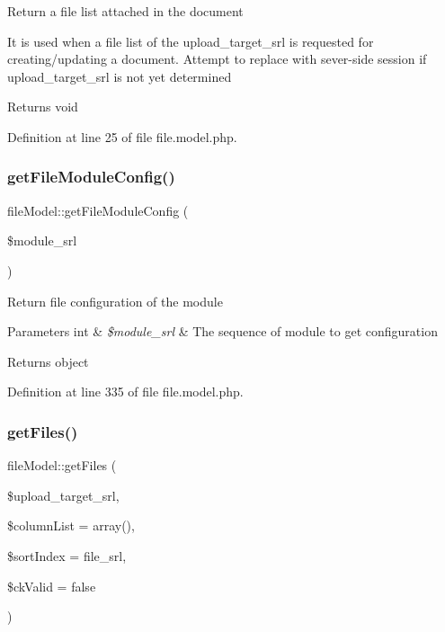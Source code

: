 Return a file list attached in the document

It is used when a file list of the upload\+\_\+target\+\_\+srl is requested for creating/updating a document. Attempt to replace with sever-\/side session if upload\+\_\+target\+\_\+srl is not yet determined

\begin{DoxyReturn}{Returns}
void 
\end{DoxyReturn}


Definition at line 25 of file file.\+model.\+php.

\mbox{\label{classfileModel_aefe867916bce4a5f3451bb9afc464844}} 
\subsubsection{\texorpdfstring{get\+File\+Module\+Config()}{getFileModuleConfig()}}
{\footnotesize\ttfamily file\+Model\+::get\+File\+Module\+Config (\begin{DoxyParamCaption}\item[{}]{\$module\+\_\+srl }\end{DoxyParamCaption})}

Return file configuration of the module


\begin{DoxyParams}[1]{Parameters}
int & {\em \$module\+\_\+srl} & The sequence of module to get configuration \\
\hline
\end{DoxyParams}
\begin{DoxyReturn}{Returns}
object 
\end{DoxyReturn}


Definition at line 335 of file file.\+model.\+php.

\mbox{\label{classfileModel_ad311bb965a415b2e95253cdbd23c5406}} 
\subsubsection{\texorpdfstring{get\+Files()}{getFiles()}}
{\footnotesize\ttfamily file\+Model\+::get\+Files (\begin{DoxyParamCaption}\item[{}]{\$upload\+\_\+target\+\_\+srl,  }\item[{}]{\$column\+List = {\ttfamily array()},  }\item[{}]{\$sort\+Index = {\ttfamily \textquotesingle{}file\+\_\+srl\textquotesingle{}},  }\item[{}]{\$ck\+Valid = {\ttfamily false} }\end{DoxyParamCaption})}

